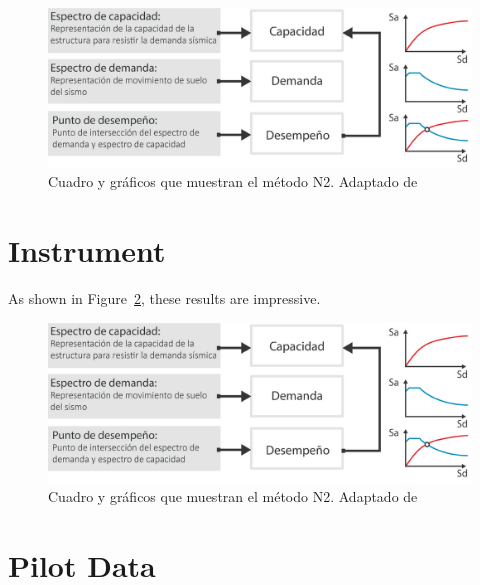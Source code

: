 \documentclass[doc, 12pt, a4paper, draftall]{apa7} %
\begin{document}
\begin{figure}[!ht]
	\centering
  \includegraphics[scale=0.36]{E_IMAGENES/3_Capitulo3/Cap3_Imagen70.png}
	\caption{\centering\footnotesize Cuadro y gráficos que muestran el método N2. Adaptado de \cite{deWaal2009}}
	\label{Cap3_Figura3}
\end{figure}

\lipsum[19]

\backmatter %

\printbibliography[heading=bibintoc, title={Referencias}]

\appendix

\section{Instrument}
\label{app:instrument}

As shown in Figure~\ref{fig:Figure2}, these results are impressive. \lipsum[20]

\begin{figure}[!ht]
	\centering
  \includegraphics[scale=0.36]{E_IMAGENES/3_Capitulo3/Cap3_Imagen70.png}
	\caption{\centering\footnotesize Cuadro y gráficos que muestran el método N2. Adaptado de \cite{deWaal2009}}
	\label{fig:Figure2}
\end{figure}

\lipsum[21]
\section{Pilot Data}
\label{app:surveydata}
\end{document}
